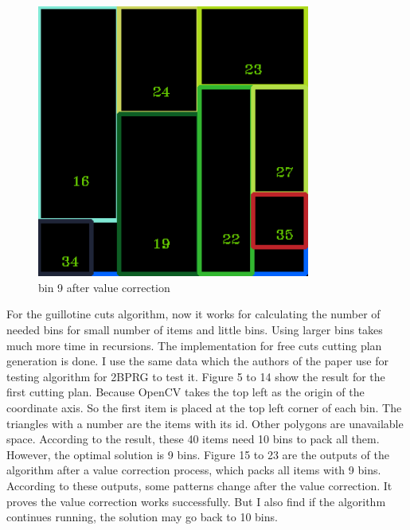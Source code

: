 \documentclass[11pt]{article}
\begin{document}
\begin{figure}
    \begin{minipage}[htb]{0.33\linewidth}
    \centering
    \includegraphics[width=0.8\textwidth]{FIGS/2/output9.png}
    \caption{bin 9 after value correction}
    \label{skyline}
    \end{minipage}

    \end{figure}

    For the guillotine cuts algorithm, now it works for calculating the number of needed bins for small number of items and little bins. Using larger bins takes much more time in recursions.
    \newline
    The implementation for free cuts cutting plan generation is done. I use the same data which the authors of the paper use for testing algorithm for 2BPRG to test it. Figure 5 to 14 show the result for the first cutting plan. Because OpenCV takes the top left as the origin of the coordinate axis. So the first item is placed at the top left corner of each bin. The triangles with a number are the items with its id. Other polygons are unavailable space. According to the result, these 40 items need 10 bins to pack all them. However, the optimal solution is 9 bins. Figure 15 to 23 are the outputs of the algorithm after a value correction process, which packs all items with 9 bins. According to these outputs, some patterns change after the value correction. It proves the value correction works successfully. But I also find if the algorithm continues running, the solution may go back to 10 bins.
\end{document}
